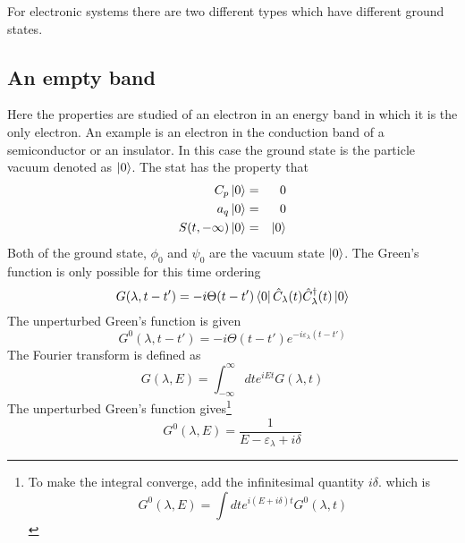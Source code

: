 For electronic systems there are two different types which have different ground states.

\subsection{An empty band}
Here the properties are studied of an electron in an energy band in which it is the only electron.
An example is an electron in the conduction band of a semiconductor or an insulator.
In this case the ground state is the particle vacuum denoted as $\ket{0}$.
The stat has the property that
\begin{eqnarray}
  C_p\ket{0} &=& 0 \label{2.52}\\
  a_q\ket{0} &=& 0 \label{2.53}\\
  S(t,-\infty) \ket{0} &=& \ket{0} \label{2.54}
\end{eqnarray}
Both of the ground state, $\phi_0$ and $\psi_0$ are the vacuum state $\ket{0}$.
The Green's function is only possible for this time ordering
\begin{equation}
  G(\lambda,t-t') = -i \Theta(t-t')\bra{0}\hat{C}_\lambda(t) \hat{C}^\dagger_\lambda(t) \ket{0}  \label{2.55}
\end{equation}
The unperturbed Green's function is given
\begin{equation}
  G^0(\lambda,t-t') = -i\Theta(t-t') e^{-i\varepsilon_\lambda (t-t')} \label{2.57}
\end{equation}
The Fourier transform is defined as
\begin{equation}
  G(\lambda,E) = \int_{-\infty}^\infty dt  e^{iEt} G(\lambda,t) \label{2.58}
\end{equation}
The unperturbed Green's function gives\footnote{
To make the integral converge, add the infinitesimal quantity $i\delta$. which is
\begin{equation*}
  G^0(\lambda,E) = \int dt e^{i(E+i\delta)t}G^0(\lambda,t)
\end{equation*}
}
\begin{equation}
  G^0(\lambda,E)= \frac{1}{E-\varepsilon_\lambda + i\delta}  \label{2.59}
\end{equation}

